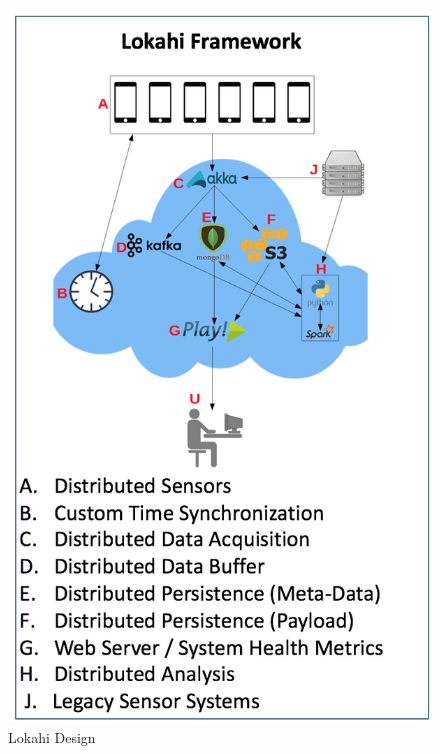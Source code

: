 \begin{figure}
	\centering
	\includegraphics[]{figures/lokahi.png}
	\caption{Lokahi Design}\label{fig:lokahi}
\end{figure}

 